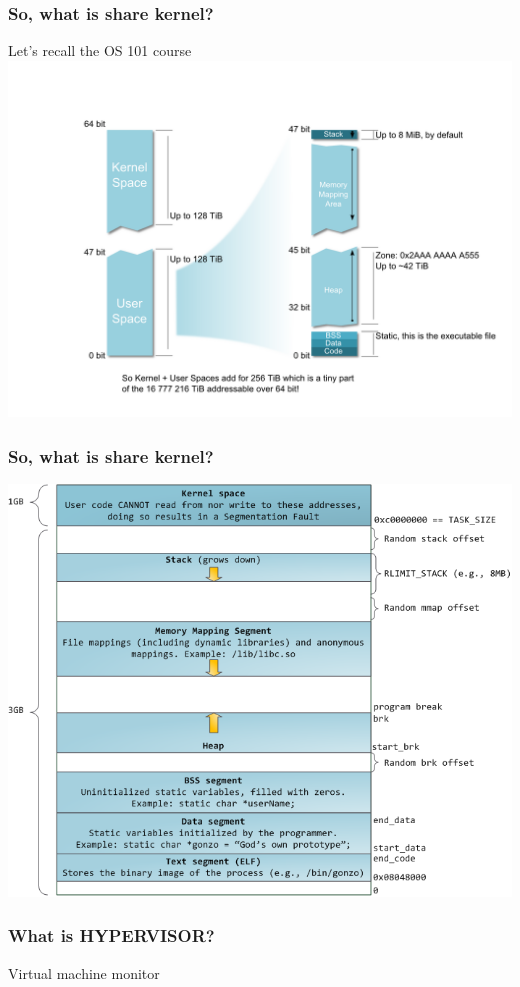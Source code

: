 \documentclass{beamer}
\begin{document}
\begin{frame}
    \frametitle{So, what is share kernel?}
    \begin{center}
        Let's recall the OS 101 course\\
        \includegraphics[width=.8\textwidth]{linux_memory_layout_64bit.png}
        \cite{64_mem_layout}
    \end{center}
\end{frame}

\begin{frame}
    \frametitle{So, what is share kernel?}
    \begin{center}
        \includegraphics[width=.7\textwidth]{32bit_mem_layout.png}
        \cite{32_mem_layout}
    \end{center}
\end{frame}

\begin{frame}
    \frametitle{What is HYPERVISOR?}
    \begin{center}
        Virtual machine monitor
    \end{center}
\end{frame}
\end{document}
